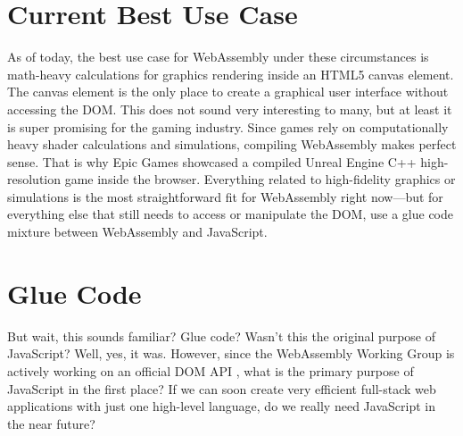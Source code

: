 \documentclass[10pt]{article}
\begin{document}
\begin{sloppypar}
  \begin{figure}[ht]
    \centering
    \label{fig:glue-code}
  \end{figure}

  \section{Current Best Use Case}
  \label{sec:use-cases}

  As of today, the best use case for WebAssembly under these circumstances is math-heavy calculations for graphics rendering inside an HTML5 canvas element. The canvas element is the only place to create a graphical user interface without accessing the DOM. This does not sound very interesting to many, but at least it is super promising for the gaming industry. Since games rely on computationally heavy shader calculations and simulations, compiling WebAssembly makes perfect sense. That is why Epic Games showcased a compiled Unreal Engine C++ high-resolution game inside the browser. Everything related to high-fidelity graphics or simulations is the most straightforward fit for WebAssembly right now—but for everything else that still needs to access or manipulate the DOM, use a glue code mixture between WebAssembly and JavaScript.

  \section{Glue Code}
  \label{sec:glue-code}

  But wait, this sounds familiar? Glue code? Wasn’t this the original purpose of JavaScript? Well, yes, it was. However, since the WebAssembly Working Group is actively working on an official DOM API \citep{mozilla_webassemblymodule_2023}, what is the primary purpose of JavaScript in the first place? If we can soon create very efficient full-stack web applications with just one high-level language, do we really need JavaScript in the near future?


\end{sloppypar}
\end{document}
